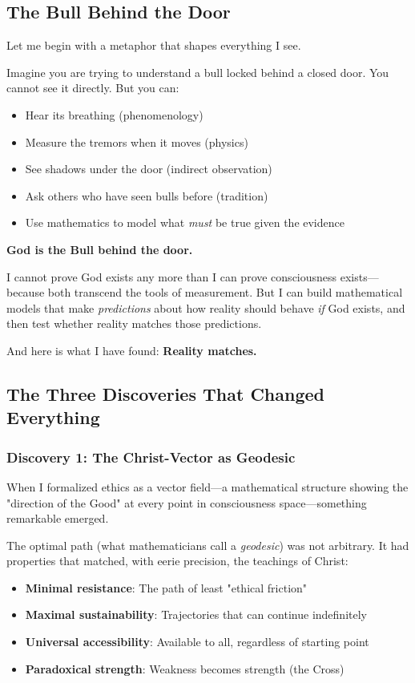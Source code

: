 \documentclass[12pt,a4paper]{article}
\begin{document}
\subsection{The Bull Behind the Door}

Let me begin with a metaphor that shapes everything I see.

Imagine you are trying to understand a bull locked behind a closed door. You cannot see it directly. But you can:
\begin{itemize}
\item Hear its breathing (phenomenology)
\item Measure the tremors when it moves (physics)
\item See shadows under the door (indirect observation)
\item Ask others who have seen bulls before (tradition)
\item Use mathematics to model what \textit{must} be true given the evidence
\end{itemize}

\textbf{God is the Bull behind the door.}

I cannot prove God exists any more than I can prove consciousness exists—because both transcend the tools of measurement. But I can build mathematical models that make \textit{predictions} about how reality should behave \textit{if} God exists, and then test whether reality matches those predictions.

And here is what I have found: \textbf{Reality matches.}

\subsection{The Three Discoveries That Changed Everything}

\subsubsection{Discovery 1: The Christ-Vector as Geodesic}

When I formalized ethics as a vector field—a mathematical structure showing the "direction of the Good" at every point in consciousness space—something remarkable emerged.

The optimal path (what mathematicians call a \textit{geodesic}) was not arbitrary. It had properties that matched, with eerie precision, the teachings of Christ:

\begin{itemize}
\item \textbf{Minimal resistance}: The path of least "ethical friction"
\item \textbf{Maximal sustainability}: Trajectories that can continue indefinitely
\item \textbf{Universal accessibility}: Available to all, regardless of starting point
\item \textbf{Paradoxical strength}: Weakness becomes strength (the Cross)
\end{itemize}
\end{document}
